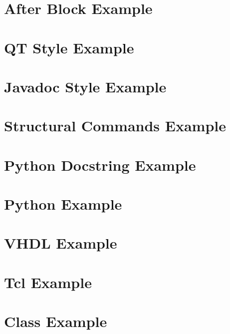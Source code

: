 \documentclass{book}
\newcommand{\+}{\discretionary{\mbox{\scriptsize$\hookleftarrow$}}{}{}}
\begin{document}
\chapter{After Block Example}\label{afterdoc_example}\hypertarget{afterdoc_example}{}
\chapter{QT Style Example}\label{qtstyle_example}\hypertarget{qtstyle_example}{}
\chapter{Javadoc Style Example}\label{jdstyle_example}\hypertarget{jdstyle_example}{}
\chapter{Structural Commands Example}\label{structcmd_example}\hypertarget{structcmd_example}{}
\chapter{Python Docstring Example}\label{python_example}\hypertarget{python_example}{}
\chapter{Python Example}\label{py_example}\hypertarget{py_example}{}
\chapter{VHDL Example}\label{vhdl_example}\hypertarget{vhdl_example}{}
\chapter{Tcl Example}\label{tcl_example}\hypertarget{tcl_example}{}

\chapter{Class Example}\label{class_example}\hypertarget{class_example}{}
\end{document}
